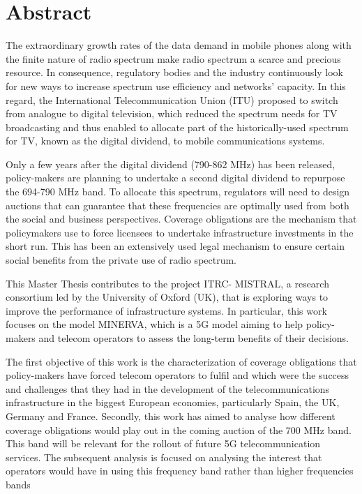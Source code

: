 \chapter{Abstract}

The extraordinary growth rates of the data demand in mobile phones along with the finite nature of radio spectrum make radio spectrum a scarce and precious resource. In consequence, regulatory bodies and the industry continuously look for new ways to increase spectrum use efficiency and networks’ capacity. In this regard, the International Telecommunication Union (ITU) proposed to switch from analogue to digital television, which reduced the spectrum needs for TV broadcasting and thus enabled to allocate part of the historically-used spectrum for TV, known as the digital dividend, to mobile communications systems.\par

Only a few years after the digital dividend (790-862 MHz) has been released, policy-makers are planning to undertake a second digital dividend to repurpose the 694-790 MHz band. To allocate this spectrum, regulators will need to design auctions that can guarantee that these frequencies are optimally used from both the social and business perspectives. Coverage obligations are the mechanism that policymakers use to force licensees to undertake infrastructure investments in the short run. This has been an extensively used legal mechanism to ensure certain social benefits from the private use of radio spectrum.\par

This Master Thesis contributes to the project ITRC- MISTRAL, a research consortium led by the University of Oxford (UK), that is exploring ways to improve the performance of infrastructure systems. In particular, this work focuses on the model MINERVA, which is a 5G model aiming to help policy-makers and telecom operators to assess the long-term benefits of their decisions.\par

The first objective of this work is the characterization of coverage obligations that policy-makers have forced telecom operators to fulfil and which were the success and challenges that they had in the development of the telecommunications infrastructure in the biggest European economies, particularly Spain, the UK, Germany and France. Secondly, this work has aimed to analyse how different coverage obligations would play out in the coming auction of the 700 MHz band. This band will be relevant for the rollout of future 5G telecommunication services. The subsequent analysis is focused on analysing the interest that operators would have in using this frequency band rather than higher frequencies bands \par

